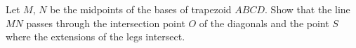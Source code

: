 Let $M$, $N$ be the midpoints of the bases of trapezoid $ABCD$. Show that the line $MN$ passes through the intersection point $O$ of the diagonals and the point $S$ where the extensions of the legs intersect.
